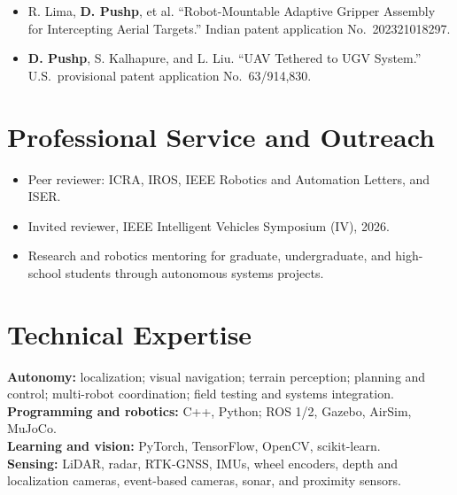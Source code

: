 \documentclass[11pt,letterpaper]{article}
\newcommand{\me}{\textbf{D. Pushp}}
\begin{document}
\begin{itemize}
    \item R. Lima, \me, et al.
    ``Robot-Mountable Adaptive Gripper Assembly for
    Intercepting Aerial Targets.''
    Indian patent application No.\ 202321018297.

    \item \me, S. Kalhapure, and L. Liu.
    ``UAV Tethered to UGV System.''
    U.S.\ provisional patent application No.\ 63/914,830.
\end{itemize}

\section{Professional Service and Outreach}

\begin{itemize}
    \item Peer reviewer: ICRA, IROS, IEEE Robotics and
    Automation Letters, and ISER.

    \item Invited reviewer, IEEE Intelligent Vehicles
    Symposium (IV), 2026.

    \item Research and robotics mentoring for graduate,
    undergraduate, and high-school students through
    autonomous systems projects.
\end{itemize}

\section{Technical Expertise}

\textbf{Autonomy:}
localization; visual navigation; terrain perception;
planning and control; multi-robot coordination;
field testing and systems integration.\\

\textbf{Programming and robotics:}
C++, Python; ROS 1/2, Gazebo, AirSim, MuJoCo.\\

\textbf{Learning and vision:}
PyTorch, TensorFlow, OpenCV, scikit-learn.\\

\textbf{Sensing:}
LiDAR, radar, RTK-GNSS, IMUs, wheel encoders,
depth and localization cameras, event-based cameras,
sonar, and proximity sensors.

\end{document}
